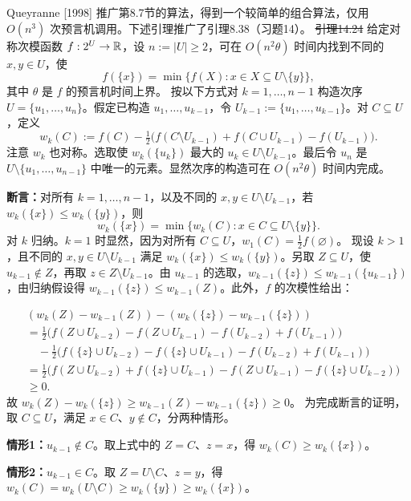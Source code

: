 Queyranne [1998] 推广第8.7节的算法，得到一个较简单的组合算法，仅用 $O(n^3)$ 次预言机调用。下述引理推广了引理8.38（习题14）。
\st{引理14.24} 给定对称次模函数 $f:2^U\to\mathbb R$，设 $n:=|U|\ge2$，可在 $O(n^2\theta)$ 时间内找到不同的 $x,y\in U$，使
\[f(\{x\})=\min\{f(X):x\in X\subseteq U\setminus\{y\}\},\]
其中 $\theta$ 是 $f$ 的预言机时间上界。
\pr 按以下方式对 $k=1,\ldots,n-1$ 构造次序 $U=\{u_1,\ldots,u_n\}$。假定已构造 $u_1,\ldots,u_{k-1}$，令 $U_{k-1}:=\{u_1,\ldots,u_{k-1}\}$。对 $C\subseteq U$，定义
\[w_k(C):=f(C)-\tfrac12\bigl(f(C\setminus U_{k-1})+f(C\cup U_{k-1})-f(U_{k-1})\bigr).\]
注意 $w_k$ 也对称。选取使 $w_k(\{u_k\})$ 最大的 $u_k\in U\setminus U_{k-1}$。最后令 $u_n$ 是 $U\setminus\{u_1,\ldots,u_{n-1}\}$ 中唯一的元素。显然次序的构造可在 $O(n^2\theta)$ 时间内完成。

\textbf{断言：}对所有 $k=1,\ldots,n-1$，以及不同的 $x,y\in U\setminus U_{k-1}$，若 $w_k(\{x\})\le w_k(\{y\})$，则
\[w_k(\{x\})=\min\{w_k(C):x\in C\subseteq U\setminus\{y\}\}.\]
对 $k$ 归纳。$k=1$ 时显然，因为对所有 $C\subseteq U$，$w_1(C)=\tfrac12f(\varnothing)$。
现设 $k>1$，且不同的 $x,y\in U\setminus U_{k-1}$ 满足 $w_k(\{x\})\le w_k(\{y\})$。另取 $Z\subseteq U$，使 $u_{k-1}\notin Z$，再取 $z\in Z\setminus U_{k-1}$。由 $u_{k-1}$ 的选取，$w_{k-1}(\{z\})\le w_{k-1}(\{u_{k-1}\})$，由归纳假设得 $w_{k-1}(\{z\})\le w_{k-1}(Z)$。此外，$f$ 的次模性给出：

\begin{align*}
&(w_k(Z)-w_{k-1}(Z))-(w_k(\{z\})-w_{k-1}(\{z\}))\\
&=\tfrac12\bigl(f(Z\cup U_{k-2})-f(Z\cup U_{k-1})-f(U_{k-2})+f(U_{k-1})\bigr)\\
&\quad-\tfrac12\bigl(f(\{z\}\cup U_{k-2})-f(\{z\}\cup U_{k-1})-f(U_{k-2})+f(U_{k-1})\bigr)\\
&=\tfrac12\bigl(f(Z\cup U_{k-2})+f(\{z\}\cup U_{k-1})-f(Z\cup U_{k-1})-f(\{z\}\cup U_{k-2})\bigr)\\
&\ge0.
\end{align*}
故 $w_k(Z)-w_k(\{z\})\ge w_{k-1}(Z)-w_{k-1}(\{z\})\ge0$。
为完成断言的证明，取 $C\subseteq U$，满足 $x\in C$、$y\notin C$，分两种情形。

\textbf{情形1：}$u_{k-1}\notin C$。取上式中的 $Z=C$、$z=x$，得 $w_k(C)\ge w_k(\{x\})$。

\textbf{情形2：}$u_{k-1}\in C$。取 $Z=U\setminus C$、$z=y$，得 $w_k(C)=w_k(U\setminus C)\ge w_k(\{y\})\ge w_k(\{x\})$。

